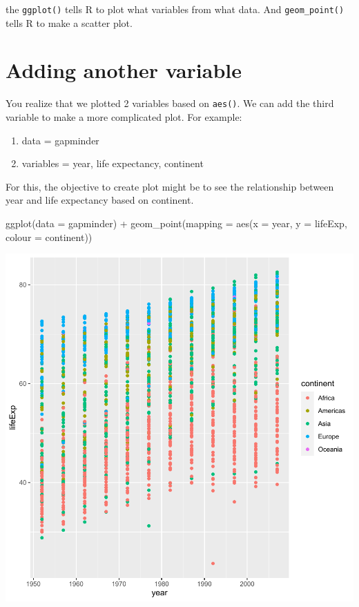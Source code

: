 \documentclass[
]{book}
\makeatletter
\newenvironment{Shaded}{\begin{snugshade}}{\end{snugshade}}
\newcommand{\AttributeTok}[1]{\textcolor[rgb]{0.61,0.61,0.61}{#1}}
\newcommand{\FunctionTok}[1]{\textcolor[rgb]{0,0,0}{#1}}
\newcommand{\NormalTok}[1]{#1}
\newcommand{\SpecialCharTok}[1]{\textcolor[rgb]{0,0,0}{#1}}
\providecommand{\tightlist}{%
  \setlength{\itemsep}{0pt}\setlength{\parskip}{0pt}}
\newenvironment{kframe}{%
\medskip{}
\setlength{\fboxsep}{.8em}
 \def\at@end@of@kframe{}%
 \ifinner\ifhmode%
  \def\at@end@of@kframe{\end{minipage}}%
  \begin{minipage}{\columnwidth}%
 \fi\fi%
 \def\FrameCommand##1{\hskip\@totalleftmargin \hskip-\fboxsep
 \colorbox{shadecolor}{##1}\hskip-\fboxsep
     \hskip-\linewidth \hskip-\@totalleftmargin \hskip\columnwidth}%
 \MakeFramed {\advance\hsize-\width
   \@totalleftmargin\z@ \linewidth\hsize
   \@setminipage}}%
 {\par\unskip\endMakeFramed%
 \at@end@of@kframe}
\renewenvironment{Shaded}{\begin{kframe}}{\end{kframe}}
\makeatother
\begin{document}
the \texttt{ggplot()} tells R to plot what variables from what data. And \texttt{geom\_point()} tells R to make a scatter plot.

\hypertarget{adding-another-variable}{%
\section{Adding another variable}\label{adding-another-variable}}

You realize that we plotted 2 variables based on \texttt{aes()}. We can add the third variable to make a more complicated plot. For example:

\begin{enumerate}
\def\labelenumi{\arabic{enumi}.}
\tightlist
\item
  data = gapminder
\item
  variables = year, life expectancy, continent
\end{enumerate}

For this, the objective to create plot might be to see the relationship between year and life expectancy based on continent.

\begin{Shaded}
\begin{Highlighting}[]
\FunctionTok{ggplot}\NormalTok{(}\AttributeTok{data =}\NormalTok{ gapminder) }\SpecialCharTok{+}
  \FunctionTok{geom\_point}\NormalTok{(}\AttributeTok{mapping =} \FunctionTok{aes}\NormalTok{(}\AttributeTok{x =}\NormalTok{ year, }\AttributeTok{y =}\NormalTok{ lifeExp, }\AttributeTok{colour =}\NormalTok{ continent))}
\end{Highlighting}
\end{Shaded}

\begin{center}\includegraphics[width=0.7\linewidth,keepaspectratio]{Multivariable_Data_Analysis_files/figure-latex/unnamed-chunk-18-1} \end{center}
\end{document}

